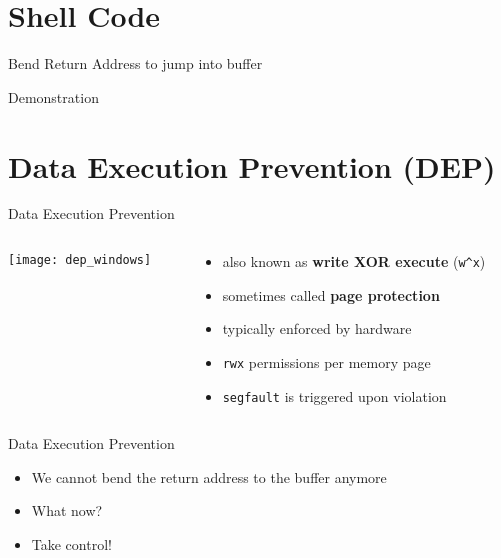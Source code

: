 \documentclass[beamer]{uibk}
\begin{document}
\section{Shell Code}

\begin{frame}{Bend Return Address to jump into buffer}
    \begin{center}
        \huge Demonstration
    \end{center}
\end{frame}

\section{Data Execution Prevention (DEP)}

\begin{frame}{Data Execution Prevention}
    \begin{columns}
        \begin{column}{0.5\textwidth}
            \begin{center}
                \texttt{[image: dep\_windows]}
            \end{center}
        \end{column}
        \begin{column}{0.5\textwidth}
            \begin{itemize}
                \item also known as \textbf{write XOR execute} (\texttt{w\^{}x})
                \medskip
                \item sometimes called \textbf{page protection}
                \bigskip
                \item typically enforced by hardware
                \medskip
                \item \texttt{rwx} permissions per memory page
                \medskip
                \item \texttt{segfault} is triggered upon violation
            \end{itemize}
        \end{column}
    \end{columns}
\end{frame}

\begin{frame}{Data Execution Prevention}
    \begin{itemize}
        \item We cannot bend the return address to the buffer anymore
        \item What now?
        \pause
        \item Take control!
    \end{itemize}
\end{frame}
\end{document}
